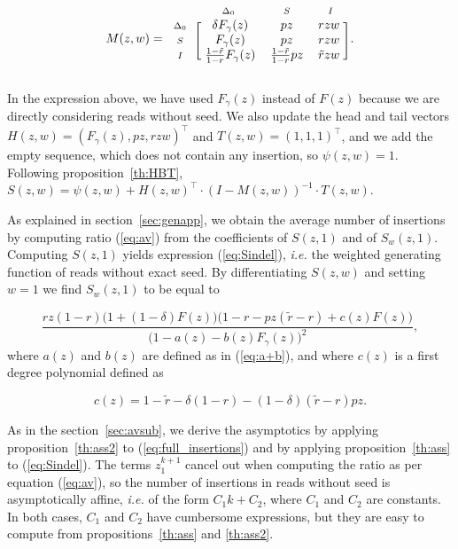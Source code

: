 \documentclass{article}
\newcommand{\smI}{\scriptstyle{I}}
\newcommand{\smS}{\scriptstyle{S}}
\newcommand{\smDELz}{\scriptstyle{\Delta_0}}
\begin{document}
\begin{equation*}
M(z,w) = 
\begin{blockarray}{cccc}
       & \smDELz & \smS & \smI \\
\begin{block}{c[ccc]}
\smDELz & \; \delta F_\gamma(z) & pz & rzw \; \\
\smS    & \;        F_\gamma(z) & pz & rzw \; \\
\smI    & \; \frac{1-\tilde{r}}{1-r}F_\gamma(z)
           & \frac{1-\tilde{r}}{1-r}pz & \tilde{r}zw \; \\
\end{block}
\end{blockarray}.
\end{equation*}

In the expression above, we have used $F_\gamma(z)$ instead of $F(z)$
because we are directly considering reads without seed. We also update the
head and tail vectors $H(z,w) = (F_\gamma(z), pz, rzw)^\top$ and
$T(z,w)=(1,1,1)^\top$, and we add the empty sequence, which does not
contain any insertion, so $\psi(z,w) = 1$. Following
proposition~\ref{th:HBT}, $S(z,w) = \psi(z,w) + H(z,w)^\top \cdot
(I-M(z,w))^{-1} \cdot T(z,w)$.

As explained in section~\ref{sec:genapp}, we obtain the average number of
insertions by computing ratio (\ref{eq:av}) from the coefficients of
$S(z,1)$ and of $S_w(z,1)$. Computing $S(z,1)$ yields expression
(\ref{eq:Sindel}), \textit{i.e.} the weighted generating function of reads
without exact seed. By differentiating $S(z,w)$ and setting $w=1$ we find
$S_w(z,1)$ to be equal to

\begin{equation}
\label{eq:full_insertions}
\frac{rz(1-r)\big(1+(1-\delta)F(z)\big)\big(1-r-pz(\tilde{r}-r)
  +c(z)F(z) \big)}
  {\big(1-a(z)-b(z)F_\gamma(z)\big)^2},
\end{equation}
where $a(z)$ and $b(z)$ are defined as in (\ref{eq:a+b}), and where $c(z)$
is a first degree polynomial defined as

\begin{equation*}
c(z) = 1-\tilde{r}-\delta(1-r) - (1-\delta)(\tilde{r}-r)pz.
\end{equation*}

As in the section~\ref{sec:avsub}, we derive the asymptotics by applying
proposition~\ref{th:ass2} to (\ref{eq:full_insertions}) and by applying
proposition~\ref{th:ass} to (\ref{eq:Sindel}). The terms $z_1^{k+1}$ cancel
out when computing the ratio as per equation (\ref{eq:av}), so the number
of insertions in reads without seed is asymptotically affine,
\textit{i.e.} of the form $C_1k+C_2$, where $C_1$ and $C_2$ are constants.
In both cases, $C_1$ and $C_2$ have cumbersome expressions, but they are
easy to compute from propositions~\ref{th:ass} and \ref{th:ass2}.
\end{document}
